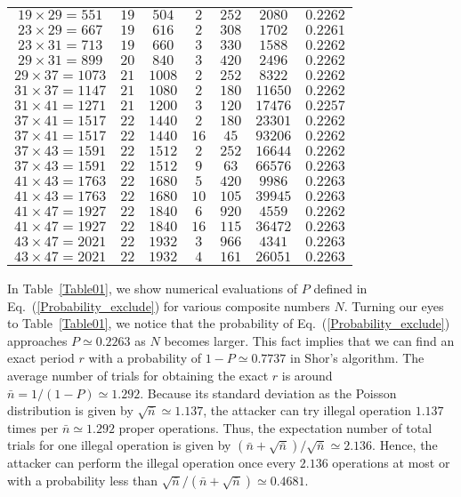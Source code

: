 \documentclass[12pt]{article}
\begin{document}
\begin{table}
\begin{center}
\begin{tabular}{|c|c|c|c|c|c|c|}
%
$19\times 29=551$ & $19$ & $504$ & $2$ & $252$ & $2080$ & $0.2262$ \\
%
$23\times 29=667$ & $19$ & $616$ & $2$ & $308$ & $1702$ & $0.2261$ \\
%
$23\times 31=713$ & $19$ & $660$ & $3$ & $330$ & $1588$ & $0.2262$ \\
%
$29\times 31=899$ & $20$ & $840$ & $3$ & $420$ & $2496$ & $0.2262$ \\
%
$29\times 37=1073$ & $21$ & $1008$ & $2$ & $252$ & $8322$ & $0.2262$ \\
%
$31\times 37=1147$ & $21$ & $1080$ & $2$ & $180$ & $11650$ & $0.2262$ \\
%
$31\times 41=1271$ & $21$ & $1200$ & $3$ & $120$ & $17476$ & $0.2257$ \\
%
$37\times 41=1517$ & $22$ & $1440$ & $2$ & $180$ & $23301$ & $0.2262$ \\
%
$37\times 41=1517$ & $22$ & $1440$ & $16$ & $45$ & $93206$ & $0.2262$ \\
%
$37\times 43=1591$ & $22$ & $1512$ & $2$ & $252$ & $16644$ & $0.2262$ \\
%
$37\times 43=1591$ & $22$ & $1512$ & $9$ & $63$ & $66576$ & $0.2263$ \\
%
$41\times 43=1763$ & $22$ & $1680$ & $5$ & $420$ & $9986$ & $0.2263$ \\
%
$41\times 43=1763$ & $22$ & $1680$ & $10$ & $105$ & $39945$ & $0.2263$ \\
%
$41\times 47=1927$ & $22$ & $1840$ & $6$ & $920$ & $4559$ & $0.2262$ \\
%
$41\times 47=1927$ & $22$ & $1840$ & $16$ & $115$ & $36472$ & $0.2263$ \\
%
$43\times 47=2021$ & $22$ & $1932$ & $3$ & $966$ & $4341$ & $0.2263$ \\
%
$43\times 47=2021$ & $22$ & $1932$ & $4$ & $161$ & $26051$ & $0.2263$ \\
\hline
\end{tabular}
\end{center}
\end{table}

In Table~\ref{Table01},
we show numerical evaluations of $P$ defined in Eq.~(\ref{Probability_exclude})
for various composite numbers $N$.
Turning our eyes to Table~\ref{Table01},
we notice that the probability of Eq.~(\ref{Probability_exclude}) approaches
$P\simeq 0.2263$
as $N$ becomes larger.
This fact implies that we can find an exact period $r$ with a probability of $1-P\simeq 0.7737$
in Shor's algorithm.
The average number of trials for obtaining the exact $r$ is around
$\bar{n}=1/(1-P)\simeq 1.292$.
Because its standard deviation as the Poisson distribution is given by $\sqrt{\bar{n}}\simeq 1.137$,
the attacker can try illegal operation $1.137$ times per $\bar{n}\simeq 1.292$ proper operations.
Thus,
the expectation number of total trials for one illegal operation is given by
$(\bar{n}+\sqrt{\bar{n}})/\sqrt{\bar{n}}\simeq 2.136$.
Hence,
the attacker can perform the illegal operation once every $2.136$ operations at most or with a probability less than
$\sqrt{\bar{n}}/(\bar{n}+\sqrt{\bar{n}})\simeq 0.4681$.
\end{document}
